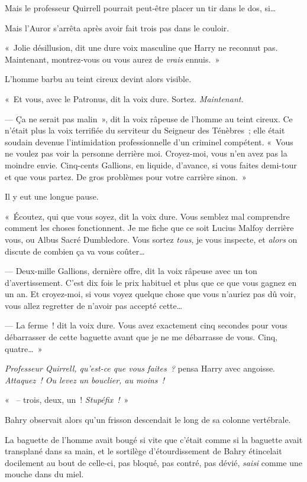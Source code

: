 Mais le professeur Quirrell pourrait peut-être placer un tir dans le dos, si…

Mais l'Auror s'arrêta après avoir fait trois pas dans le couloir.

«~Jolie désillusion, dit une dure voix masculine que Harry ne reconnut pas. Maintenant, montrez-vous ou vous aurez de \emph{vrais} ennuis.~»

L'homme barbu au teint cireux devint alors visible.

«~Et vous, avec le Patronus, dit la voix dure. Sortez. \emph{Maintenant.}

--- Ça ne serait pas malin~», dit la voix râpeuse de l'homme au teint cireux. Ce n'était plus la voix terrifiée du serviteur du Seigneur des Ténèbres~; elle était soudain devenue l'intimidation professionnelle d'un criminel compétent. «~Vous ne voulez pas voir la personne derrière moi. Croyez-moi, vous n'en avez pas la moindre envie. Cinq-cents Gallions, en liquide, d'avance, si vous faites demi-tour et que vous partez. De gros problèmes pour votre carrière sinon.~»

Il y eut une longue pause.

«~Écoutez, qui que vous soyez, dit la voix dure. Vous semblez mal comprendre comment les choses fonctionnent. Je me fiche que ce soit Lucius Malfoy derrière vous, ou Albus Sacré Dumbledore. Vous sortez \emph{tous}, je vous inspecte, et \emph{alors} on discute de combien ça va vous coûter…

--- Deux-mille Gallions, dernière offre, dit la voix râpeuse avec un ton d'avertissement. C'est dix fois le prix habituel et plus que ce que vous gagnez en un an. Et croyez-moi, si vous voyez quelque chose que vous n'auriez pas dû voir, vous allez regretter de n'avoir pas accepté cette…

--- La ferme~! dit la voix dure. Vous avez exactement cinq secondes pour vous débarrasser de cette baguette avant que je ne me débarrasse de vous. Cinq, quatre…~»

\emph{Professeur Quirrell, qu'est-ce que vous faites~?} pensa Harry avec angoisse. \emph{Attaquez~! Ou levez un bouclier, au moins~!}

«~ -- trois, deux, un~! \emph{Stupéfix~!}~»

\later

Bahry observait alors qu'un frisson descendait le long de sa colonne vertébrale.

La baguette de l'homme avait bougé si vite que c'était comme si la baguette avait transplané dans sa main, et le sortilège d'étourdissement de Bahry étincelait docilement au bout de celle-ci, pas bloqué, pas contré, pas dévié, \emph{saisi} comme une mouche dans du miel.

